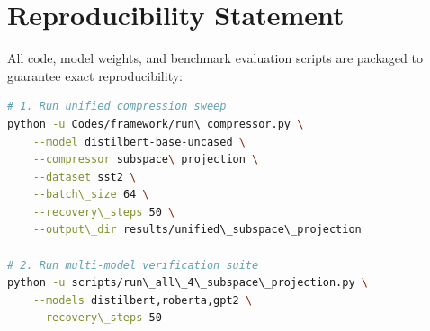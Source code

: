 \section{Reproducibility Statement}
All code, model weights, and benchmark evaluation scripts are packaged to guarantee exact reproducibility:
\begin{lstlisting}[language=bash]
# 1. Run unified compression sweep
python -u Codes/framework/run\_compressor.py \
    --model distilbert-base-uncased \
    --compressor subspace\_projection \
    --dataset sst2 \
    --batch\_size 64 \
    --recovery\_steps 50 \
    --output\_dir results/unified\_subspace\_projection

# 2. Run multi-model verification suite
python -u scripts/run\_all\_4\_subspace\_projection.py \
    --models distilbert,roberta,gpt2 \
    --recovery\_steps 50
\end{lstlisting}
